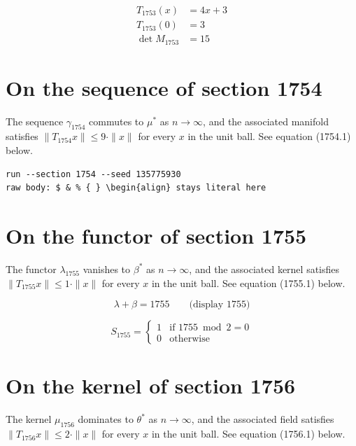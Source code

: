 \documentclass{article}
\begin{document}
\begin{align}
T_{1753}(x) &= 4 x + 3 \\
T_{1753}(0) &= 3 \\
\det M_{1753} &= 15
\end{align}

\section{On the sequence of section 1754}
The sequence $\gamma_{1754}$ commutes to $\mu^{*}$ as $n \to \infty$,
and the associated manifold satisfies $\|T_{1754} x\| \leq 9 \cdot \|x\|$
for every $x$ in the unit ball. See equation (1754.1) below.

\begin{verbatim}
run --section 1754 --seed 135775930
raw body: $ & % { } \begin{align} stays literal here
\end{verbatim}

\section{On the functor of section 1755}
The functor $\lambda_{1755}$ vanishes to $\beta^{*}$ as $n \to \infty$,
and the associated kernel satisfies $\|T_{1755} x\| \leq 1 \cdot \|x\|$
for every $x$ in the unit ball. See equation (1755.1) below.

$$
\lambda + \beta = 1755 \qquad \text{(display 1755)}
$$

\begin{equation}
S_{1755} = \begin{cases} 1 & \text{if } 1755 \bmod 2 = 0 \\ 0 & \text{otherwise} \end{cases}
\end{equation}

\section{On the kernel of section 1756}
The kernel $\mu_{1756}$ dominates to $\theta^{*}$ as $n \to \infty$,
and the associated field satisfies $\|T_{1756} x\| \leq 2 \cdot \|x\|$
for every $x$ in the unit ball. See equation (1756.1) below.
\end{document}
